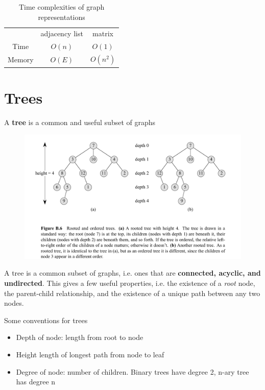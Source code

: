 \documentclass[../notes.tex]{subfiles}
\begin{document}
\begin{table}[H]
	\centering
	\caption{Time complexities of graph representations}
	\begin{tabular}{c|c|c|}
		\hline
		& adjacency list & matrix  \\
		Time & $ O(n) $ & $O(1)$ \\ 
		Memory & $ O(E) $ & $ O(n^2) $ 
	\end{tabular}
\end{table}












\section{Trees}

A \textbf{tree} is a common and useful subset of graphs
\begin{figure}[H]
	\centering
	\includegraphics[width=0.8\linewidth]{img/image_2022-09-22-00-39-29.png}
\end{figure}
\begin{definition}
	A tree is a common subset of graphs, i.e. ones that are \textbf{connected, acyclic, and undirected}.
	This gives a few useful properties, i.e. the existence of a \textit{root} node, the parent-child relationship, and the existence of a unique path between any two nodes.
\end{definition}

Some conventions for trees

\begin{itemize}
	\item Depth of node: length from root to node
	\item Height length of longest path from node to leaf
	\item Degree of node: number of children. Binary trees have degree 2, n-ary tree has degree n
\end{itemize}
\end{document}
